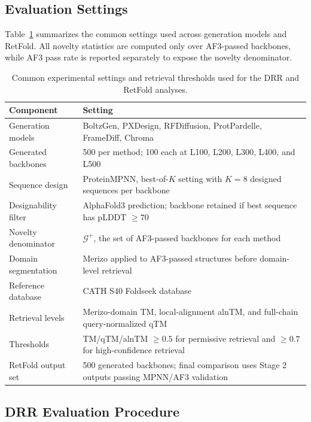 \documentclass[letterpaper]{article} %
\begin{document}
\subsection{Evaluation Settings}

Table~\ref{tab:app_settings} summarizes the common settings used across generation models and RetFold. All novelty statistics are computed only over AF3-passed backbones, while AF3 pass rate is reported separately to expose the novelty denominator.

\begin{table}[t]
\centering
\small
\begin{tabular}{ll}
\toprule
Component & Setting \\
\midrule
Generation models & BoltzGen, PXDesign, RFDiffusion, ProtPardelle, FrameDiff, Chroma \\
Generated backbones & 500 per method; 100 each at L100, L200, L300, L400, and L500 \\
Sequence design & ProteinMPNN, best-of-$K$ setting with $K=8$ designed sequences per backbone \\
Designability filter & AlphaFold3 prediction; backbone retained if best sequence has pLDDT $\geq 70$ \\
Novelty denominator & $\mathcal{G}^{+}$, the set of AF3-passed backbones for each method \\
Domain segmentation & Merizo applied to AF3-passed structures before domain-level retrieval \\
Reference database & CATH S40 Foldseek database \\
Retrieval levels & Merizo-domain TM, local-alignment alnTM, and full-chain query-normalized qTM \\
Thresholds & TM/qTM/alnTM $\geq 0.5$ for permissive retrieval and $\geq 0.7$ for high-confidence retrieval \\
RetFold output set & 500 generated backbones; final comparison uses Stage 2 outputs passing MPNN/AF3 validation \\
\bottomrule
\end{tabular}
\caption{Common experimental settings and retrieval thresholds used for the DRR and RetFold analyses.}
\label{tab:app_settings}
\end{table}

\subsection{DRR Evaluation Procedure}
\end{document}
